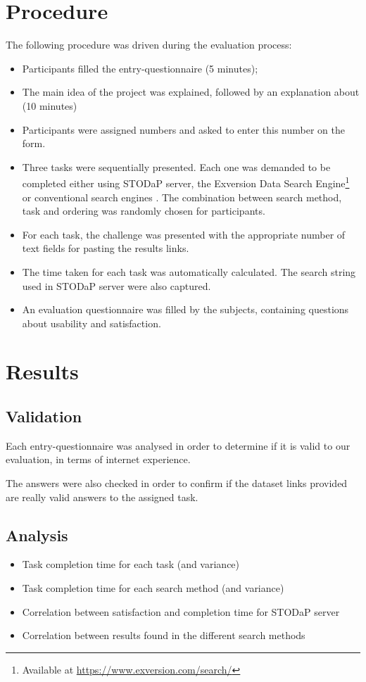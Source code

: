 \section{Procedure}

The following procedure was driven during the evaluation process:

\begin{itemize}
	\item Participants filled the entry-questionnaire (5 minutes);
	\item The main idea of the project was explained, followed by an explanation about (10 minutes)
	\item Participants were assigned numbers and asked to enter this number on the form. 
	\item Three tasks were sequentially presented. 
	Each one was demanded to be completed either using STODaP server, the Exversion Data Search Engine\footnote{Available at \url{https://www.exversion.com/search/}} or conventional search engines \cite{Xu2009}.
	The combination between search method, task and ordering was randomly chosen for participants.
	\item For each task, the challenge was presented with the appropriate number of text fields for pasting the results links.
	\item The time taken for each task was automatically calculated. The search string used in STODaP server were also captured.
	\item An evaluation questionnaire was filled by the subjects, containing questions about usability and satisfaction.
\end{itemize}

\section{Results}
\label{sec:eval_results}

\subsection{Validation}
Each entry-questionnaire was analysed in order to determine if it is valid to our evaluation, in terms of internet experience.

The answers were also checked in order to confirm if the dataset links provided are really valid answers to the assigned task.

\subsection{Analysis}
\begin{itemize}
	\item Task completion time for each task (and variance) \cite{Xu2009}
	\item Task completion time for each search method (and variance) \cite{Xu2009}
	\item Correlation between satisfaction and completion time for STODaP server \cite{Xu2009}
	\item Correlation between results found in the different search methods \cite{Vaughan2004}

\end{itemize}


